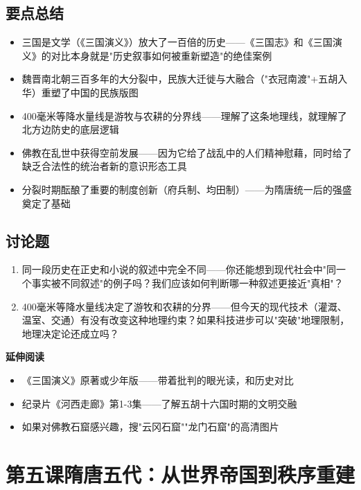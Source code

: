 \documentclass[a4paper,12pt]{ctexart}
\begin{document}
\subsection*{要点总结}
\begin{itemize}
  \item 三国是文学（《三国演义》）放大了一百倍的历史——《三国志》和《三国演义》的对比本身就是"历史叙事如何被重新塑造"的绝佳案例
  \item 魏晋南北朝三百多年的大分裂中，民族大迁徙与大融合（"衣冠南渡"+五胡入华）重塑了中国的民族版图
  \item 400毫米等降水量线是游牧与农耕的分界线——理解了这条地理线，就理解了北方边防史的底层逻辑
  \item 佛教在乱世中获得空前发展——因为它给了战乱中的人们精神慰藉，同时给了缺乏合法性的统治者新的意识形态工具
  \item 分裂时期酝酿了重要的制度创新（府兵制、均田制）——为隋唐统一后的强盛奠定了基础
\end{itemize}

\subsection*{讨论题}
\begin{enumerate}
  \item 同一段历史在正史和小说的叙述中完全不同——你还能想到现代社会中"同一个事实被不同叙述"的例子吗？我们应该如何判断哪一种叙述更接近"真相"？
  \item 400毫米等降水量线决定了游牧和农耕的分界——但今天的现代技术（灌溉、温室、交通）有没有改变这种地理约束？如果科技进步可以"突破"地理限制，地理决定论还成立吗？
\end{enumerate}

\vspace{0.3cm}
\textcolor{blue!70!black}{\textbf{延伸阅读}}
\begin{itemize}
  \item 《三国演义》原著或少年版——带着批判的眼光读，和历史对比
  \item 纪录片《河西走廊》第1-3集——了解五胡十六国时期的文明交融
  \item 如果对佛教石窟感兴趣，搜"云冈石窟""龙门石窟"的高清图片
\end{itemize}

\newpage

\section{\textcolor{orange!80!black}{第五课\quad 隋唐五代：从世界帝国到秩序重建}}
\end{document}
